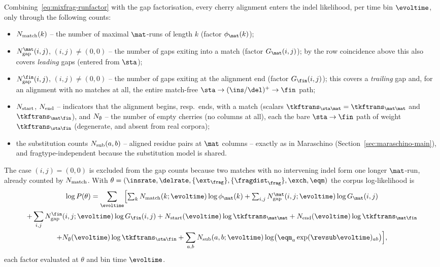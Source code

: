 Combining~\eqref{eq:mixfrag-runfactor} with the gap factorisation, every cherry
alignment enters the indel likelihood, per time bin $\evoltime$, only through the
following counts:
\begin{itemize}
\item $N_{\mathrm{match}}(k)$ -- the number of maximal $\mat$-runs of length $k$
  (factor $\runfac_\mat(k)$);
\item $\NgapM(i,j)$, $(i,j)\neq(0,0)$ -- the number of gaps exiting into a match
  (factor $G_\mat(i,j)$); by the row coincidence above this also covers
  \emph{leading} gaps (entered from $\sta$);
\item $\NgapE(i,j)$, $(i,j)\neq(0,0)$ -- the number of gaps exiting at the
  alignment end (factor $G_\fin(i,j)$); this covers a \emph{trailing} gap and, for
  an alignment with no matches at all, the entire match-free
  $\sta\to(\ins/\del)^+\to\fin$ path;
\item $N_{\mathrm{start}}$, $N_{\mathrm{end}}$ -- indicators that the alignment begins, resp.\ ends, with
  a match (scalars $\tkftrans_{\sta\mat}=\tkftrans_{\mat\mat}$ and
  $\tkftrans_{\mat\fin}$), and $N_{\emptyset}$ -- the number of empty cherries (no
  columns at all), each the bare $\sta\to\fin$ path of weight $\tkftrans_{\sta\fin}$
  (degenerate, and absent from real corpora);
\item the substitution counts $N_{\mathrm{sub}}(a,b)$ -- aligned residue pairs at $\mat$
  columns -- exactly as in Maraschino (Section~\ref{sec:maraschino-main}), and
  fragtype-independent because the substitution model is shared.
\end{itemize}
The case $(i,j)=(0,0)$ is excluded from the gap counts because two matches with no
intervening indel form one longer $\mat$-run, already counted by $N_{\mathrm{match}}$.
With $\theta=(\insrate,\delrate,\{\ext_\frag\},\{\fragdist_\frag\},\exch,\eqm)$ the
corpus log-likelihood is
\begin{multline}\label{eq:mixfrag-summary-ll}
\log P(\theta)=\sum_\evoltime\Bigl[\textstyle
\sum_k \Nmatch(k;\evoltime)\log\runfac_\mat(k)
+ \sum_{i,j}\NgapM(i,j;\evoltime)\log G_\mat(i,j) \\
+ \sum_{i,j}\NgapE(i,j;\evoltime)\log G_\fin(i,j)
+ \Nstart(\evoltime)\log\tkftrans_{\mat\mat}
+ \Nend(\evoltime)\log\tkftrans_{\mat\fin} \\
+ \Nempty(\evoltime)\log\tkftrans_{\sta\fin}
+ \sum_{a,b}\Nsub(a,b;\evoltime)\log\bigl(\eqm_a\exp(\revsub\evoltime)_{ab}\bigr)
\Bigr],
\end{multline}
each factor evaluated at $\theta$ and bin time $\evoltime$.

